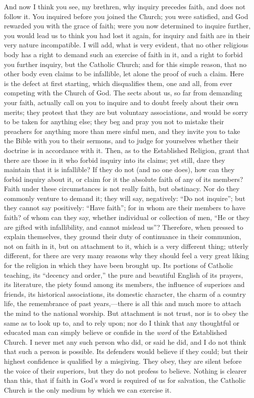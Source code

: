 And now I think you see, my brethren, why inquiry precedes faith,
and does not follow it. You inquired before you joined the Church; you
were satisfied, and God rewarded you with the grace of faith; were you
now determined to inquire further, you would lead us to think you had
lost it again, for inquiry and faith are in their very nature
incompatible. I will add, what is very evident, that no other
religious body has a right to demand such an exercise of faith in it,
and a right to forbid you further inquiry, but the Catholic Church;
and for this simple reason, that no other body even claims to be
infallible, let alone the proof of such a claim. Here is the defect at
first starting, which disqualifies them, one and all, from ever
competing with the Church of God. The sects about us, so far from
demanding your faith, actually call on you to inquire and to doubt
freely about their own merits; they protest that they are but
voluntary associations, and would be sorry to be taken for anything
else; they beg and pray you not to mistake their preachers for
anything more than mere sinful men, and they invite you to take the
Bible with you to their sermons, and to judge for yourselves whether
their doctrine is in accordance with it. Then, as to the Established
Religion, grant that there are those in it who forbid inquiry into its
claims; yet still, dare they maintain that it is infallible? If they
do not (and no one does), how can they forbid inquiry about it, or
claim for it the absolute faith of any of its members? Faith under
these circumstances is not really faith, but obstinacy. Nor do they
commonly venture to demand it; they will say, negatively: ``Do not
inquire''; but they cannot say positively: ``Have faith'';
for in whom are their members to have faith? of whom can they say,
whether individual or collection of men, ``He or they are gifted
with infallibility, and cannot mislead us''? Therefore, when
pressed to explain themselves, they ground their duty of continuance
in their communion, not on faith in it, but on attachment to it, which
is a very different thing; utterly different, for there are very many
reasons why they should feel a very great liking for the religion in
which they have been brought up. Its portions of Catholic teaching,
its ``decency and order,'' the pure and beautiful English of
its prayers, its literature, the piety found among its members, the
influence of superiors and friends, its historical associations, its
domestic character, the charm of a country life, the remembrance of
past years,—there is all this and much more to attach the mind to
the national worship. But attachment is not trust, nor is to obey the
same as to look up to, and to rely upon; nor do I think that any
thoughtful or educated man can simply believe or confide in the \emph{word}
of the Established Church. I never met any such person who did, or
said he did, and I do not think that such a person is possible. Its
defenders would believe if they could; but their highest confidence is
qualified by a misgiving. They obey, they are silent before the voice
of their superiors, but they do not profess to believe. Nothing is
clearer than this, that if faith in God's word is required of us for
salvation, the Catholic Church is the only medium by which we can
exercise it.

